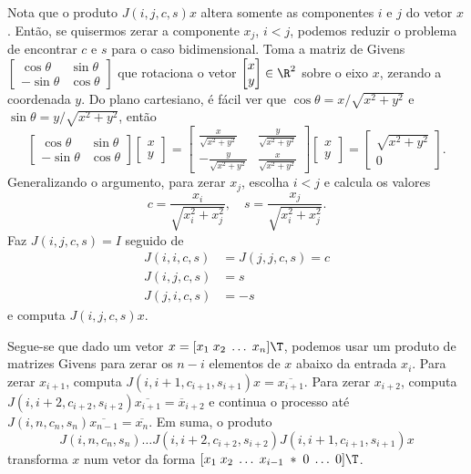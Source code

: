 \documentclass{article}
\begin{document}
Nota que o produto \(J(i,j,c,s)x\) altera somente as componentes \(i\) e \(j\) do vetor \(x\). Então, se quisermos zerar a componente \(x_j\), \(i<j\), podemos reduzir o problema de encontrar \(c\) e \(s\) para o caso bidimensional. Toma a matriz de Givens \(\begin{bmatrix} \cos \theta & \sin \theta \\ -\sin \theta & \cos \theta\end{bmatrix}\) que rotaciona o vetor \(\begin{bmatrix} x \\ y\end{bmatrix} \in \R^2\) sobre o eixo \(x\), zerando a coordenada \(y\).
Do plano cartesiano, é fácil ver que \(\cos \theta = x/\sqrt{x^2+y^2}\) e \(\sin \theta = y/\sqrt{x^2+y^2}\), então 
\[
    \begin{bmatrix}
        \cos \theta & \sin \theta \\
        -\sin \theta & \cos \theta
    \end{bmatrix}
    \begin{bmatrix}
        x \\
        y
    \end{bmatrix}
    =
    \begin{bmatrix}
        \frac{x}{\sqrt{x^2+y^2}} & \frac{y}{\sqrt{x^2+y^2}} \\
        -\frac{y}{\sqrt{x^2+y^2}} & \frac{x}{\sqrt{x^2+y^2}}
    \end{bmatrix}
    \begin{bmatrix}
        x \\
        y
    \end{bmatrix}
    =
    \begin{bmatrix}
        \sqrt{x^2+y^2} \\
        0
    \end{bmatrix}.
\]
Generalizando o argumento, para zerar \(x_j\), escolha \(i<j\) e calcula os valores 
\[
    c=\frac{x_i}{\sqrt{x_i^2+x_j^2}}, \quad s=\frac{x_j}{\sqrt{x_i^2+x_j^2}}.
\] 
Faz \(J(i,j,c,s)=I\) seguido de
\begin{align*}
    J(i,i,c,s) &= J(j,j,c,s) = c \\
    J(i,j,c,s) &= s \\
    J(j,i,c,s) &= -s
\end{align*}
e computa \(J(i,j,c,s)x\). 

Segue-se que dado um vetor \(x=[x_1 \; x_2 \; \ldots \; x_n]\T \), podemos usar um produto de matrizes Givens para zerar os \(n-i\) elementos de \(x\) abaixo da entrada \(x_i\). Para zerar \(x_{i+1}\), computa \(J(i,i+1,c_{i+1},s_{i+1})x=\allowbreak \overline{x_{i+1}}\). Para zerar \(x_{i+2}\), computa \(J(i,i+2,c_{i+2},s_{i+2})\overline{x_{i+1}}=\overline{x}_{i+2}\) e continua o processo até \(J(i,n,c_n,s_n)\overline{x_{n-1}}=\overline{x_n}\). Em suma, o produto
\[
    J(i,n,c_n,s_n) \ldots J(i,i+2,c_{i+2},s_{i+2}) J(i,i+1,c_{i+1},s_{i+1})x
\]
transforma \(x\) num vetor da forma \([x_1 \; x_2 \; \ldots \; x_{i-1} \; * \; 0 \; \ldots \; 0]\T \).
\end{document}
